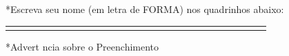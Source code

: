 \documentclass{article}
\begin{document}
*Escreva seu nome (em letra de FORMA) nos quadrinhos abaixo:
\begin{center}
 \begin{tabular}{|p{0.3cm}|p{0.3cm}|p{0.3cm}|p{0.3cm}|p{0.3cm}|p{0.3cm}|p{0.3cm}|p{0.3cm}|p{0.3cm}|p{0.3cm}|p{0.3cm}|p{0.3cm}|p{0.3cm}|p{0.3cm}|p{0.3cm}|p{0.3cm}|p{0.3cm}|p{0.3cm}|p{0.3cm}|p{0.3cm}|p{0.3cm}|p{0.3cm}|p{0.3cm}|p{0.3cm}|p{0.3cm}|p{0.3cm}|p{0.3cm}|}
 \hline  &  &  &  &  &  &  &  &  &  &  &  &  &  &  &  &  &  &  &  &  &  &  &  &  &  &    \\ 
 \hline  &  &  &  &  &  &  &  &  &  &  &  &  &  &  &  &  &  &  &  &  &  &  &  &  &  &    \\ 
 \hline 
\end{tabular}
\end{center}
*Advert ncia sobre o Preenchimento\\
\end{document}
